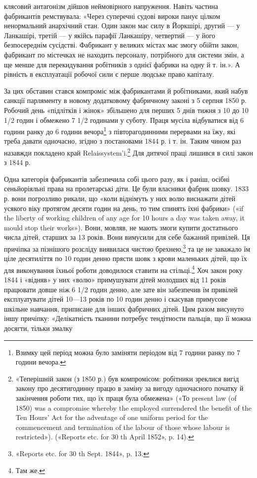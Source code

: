 клясовий антагонізм дійшов неймовірного напруження. Навіть
частина фабрикантів ремствувала: «Через суперечні судові
вироки панує цілком ненормальний анархічний стан. Один закон
має силу в Йоркшірі, другий — у Ланкашірі, третій — у якійсь
парафії Ланкашіру, четвертий — у його безпосереднім сусідстві.
Фабрикант у великих містах має змогу обійти закон, фабрикант
по містечках не находить персоналу, потрібного для системи змін,
а ще менше для перекидування робітників з однієї фабрики на
одну й т. ін.». А рівність в експлуатації робочої сили є перше
людське право капіталу.

За цих обставин стався компроміс між фабрикантами й робітниками,
який набув санкції парляменту в новому додатковому
фабричному законі з 5 серпня 1850 р. Робочий день «підлітків
і жінок» збільшено для перших 5 днів тижня з 10 до 10 1/2 годин
і обмежено 7 1/2 годинами у суботу. Праця мусіла відбуватися від
6 години ранку до 6 години вечора\footnote{
Взимку цей період можна було заміняти періодом від 7 години
ранку по 7 години вечора.
} з півторагодинними перервами
на їжу, які треба давати одночасно, згідно з постановами
1844 р. і т. ін. Таким чином раз назавжди покладено край
Relaissystem’i.\footnote{
«Теперішній закон (з 1850 р.) був компромісом: робітники зреклися
вигід закону про десятигодинну працю в заміну за вигоду одночасного
початку й закінчення роботи тих, що їх праця була обмежена» («То
present law (of 1850) was a compromise whereby the employed surrendered
the benefit of the Ten Hours’ Act for the adventage of one uniform period
for the commencement and termination of the labour of those whose labour
is restricted»). («Reports etc. for 30 th April 1852», p. 14).
} Для дитячої праці лишився в силі закон з
1844 р.

Одна категорія фабрикантів забезпечила собі цього разу,
як і раніш, осібні сеньйоріяльні права на пролетарські діти. Це
були власники фабрик шовку. 1833 р. вони погрозливо рикали,
що «коли віднімуть у них волю виснажати дітей усякого віку
протягом десяти годин на день, то тим спинять їхні фабрики»
(«if the liberty of working children of any age for 10 hours a day
was taken away, it mould stop their works»). Вони, мовляв, не
мають змоги купити достатнього числа дітей, старших за 13 років.
Вони вимусили для себе бажаний привілей. Ця причіпка за пізнішого
розсліду виявилася чистою брехнею,\footnote{
«Reports etc. for 30 th Sept. 1844», p. 13.
} та це не заважало
їм ціле десятиліття по 10 годин денно прясти шовк з крови
маленьких дітей, що їх для виконування їхньої роботи доводилося
ставити на стільці.\footnote{
Там же.
} Хоч закон року 1844 і «відняв» у них
«волю» примушувати дітей молодших від 11 років працювати
довше ніж 6 1/2 годин денно, але зате він забезпечив їм привілей
експлуатувати дітей 10—13 років по 10 годин денно і скасував
примусове шкільне навчання, приписане для інших фабричних
дітей. Цим разом висунуто іншу причіпку: «Делікатність тканини
потребує тендітности пальців, що її можна досягти, тільки змалку